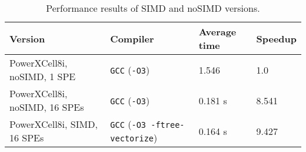 \begin{table}[htb]
\begin{footnotesize}
\caption{Performance results of SIMD and noSIMD versions.}
\label{tab:t1}
\newcommand{\m}{\hphantom{$-$}}
\newcommand{\cc}[1]{\multicolumn{1}{c}{#1}}
\renewcommand{\tabcolsep}{0.5pc} %
\renewcommand{\arraystretch}{1.2} %
\begin{tabular}{@{}llll}
\hline
\textbf{Version} & \textbf{Compiler} & \textbf{Average time} & \textbf{Speedup} \\
\hline
PowerXCell8i, noSIMD, 1 SPE & \texttt{GCC} (\texttt{-O3}) & 1.546 & 1.0 \\
PowerXCell8i, noSIMD, 16 SPEs & \texttt{GCC} (\texttt{-O3}) & 0.181 s &  8.541 \\
PowerXCell8i, SIMD, 16 SPEs & \texttt{GCC} (\texttt{-O3 -ftree-vectorize}) & 0.164 s & 9.427 \\
\hline
\end{tabular}\\[2pt]
\end{footnotesize}
\end{table}

